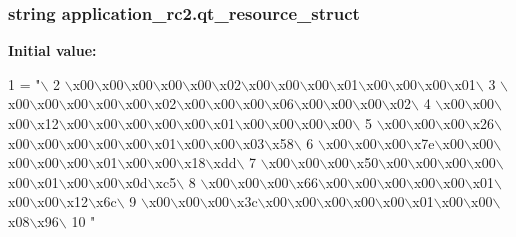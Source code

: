 \subsubsection[{qt\+\_\+resource\+\_\+struct}]{\setlength{\rightskip}{0pt plus 5cm}string application\+\_\+rc2.\+qt\+\_\+resource\+\_\+struct}\label{namespaceapplication__rc2_ad587a0ed4c9426fa156828d7210e599c}
{\bfseries Initial value\+:}
\begin{DoxyCode}
1 = \textcolor{stringliteral}{"\(\backslash\)}
2 \textcolor{stringliteral}{\(\backslash\)x00\(\backslash\)x00\(\backslash\)x00\(\backslash\)x00\(\backslash\)x00\(\backslash\)x02\(\backslash\)x00\(\backslash\)x00\(\backslash\)x00\(\backslash\)x01\(\backslash\)x00\(\backslash\)x00\(\backslash\)x00\(\backslash\)x01\(\backslash\)}
3 \textcolor{stringliteral}{\(\backslash\)x00\(\backslash\)x00\(\backslash\)x00\(\backslash\)x00\(\backslash\)x00\(\backslash\)x02\(\backslash\)x00\(\backslash\)x00\(\backslash\)x00\(\backslash\)x06\(\backslash\)x00\(\backslash\)x00\(\backslash\)x00\(\backslash\)x02\(\backslash\)}
4 \textcolor{stringliteral}{\(\backslash\)x00\(\backslash\)x00\(\backslash\)x00\(\backslash\)x12\(\backslash\)x00\(\backslash\)x00\(\backslash\)x00\(\backslash\)x00\(\backslash\)x00\(\backslash\)x01\(\backslash\)x00\(\backslash\)x00\(\backslash\)x00\(\backslash\)x00\(\backslash\)}
5 \textcolor{stringliteral}{\(\backslash\)x00\(\backslash\)x00\(\backslash\)x00\(\backslash\)x26\(\backslash\)x00\(\backslash\)x00\(\backslash\)x00\(\backslash\)x00\(\backslash\)x00\(\backslash\)x01\(\backslash\)x00\(\backslash\)x00\(\backslash\)x03\(\backslash\)x58\(\backslash\)}
6 \textcolor{stringliteral}{\(\backslash\)x00\(\backslash\)x00\(\backslash\)x00\(\backslash\)x7e\(\backslash\)x00\(\backslash\)x00\(\backslash\)x00\(\backslash\)x00\(\backslash\)x00\(\backslash\)x01\(\backslash\)x00\(\backslash\)x00\(\backslash\)x18\(\backslash\)xdd\(\backslash\)}
7 \textcolor{stringliteral}{\(\backslash\)x00\(\backslash\)x00\(\backslash\)x00\(\backslash\)x50\(\backslash\)x00\(\backslash\)x00\(\backslash\)x00\(\backslash\)x00\(\backslash\)x00\(\backslash\)x01\(\backslash\)x00\(\backslash\)x00\(\backslash\)x0d\(\backslash\)xc5\(\backslash\)}
8 \textcolor{stringliteral}{\(\backslash\)x00\(\backslash\)x00\(\backslash\)x00\(\backslash\)x66\(\backslash\)x00\(\backslash\)x00\(\backslash\)x00\(\backslash\)x00\(\backslash\)x00\(\backslash\)x01\(\backslash\)x00\(\backslash\)x00\(\backslash\)x12\(\backslash\)x6c\(\backslash\)}
9 \textcolor{stringliteral}{\(\backslash\)x00\(\backslash\)x00\(\backslash\)x00\(\backslash\)x3c\(\backslash\)x00\(\backslash\)x00\(\backslash\)x00\(\backslash\)x00\(\backslash\)x00\(\backslash\)x01\(\backslash\)x00\(\backslash\)x00\(\backslash\)x08\(\backslash\)x96\(\backslash\)}
10 \textcolor{stringliteral}{"}
\end{DoxyCode}
